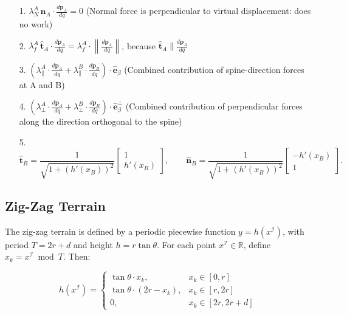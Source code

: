 \documentclass[11pt]{article}
\begin{document}
\begin{itemize}
  \item[1.] \( \lambda_N^A \, \hat{\mathbf{n}}_A \cdot \frac{d\mathbf{p}_A}{dq} = 0 \)  
        (Normal force is perpendicular to virtual displacement: does no work)

  \item[2.] \( \lambda_f^A \, \hat{\mathbf{t}}_A \cdot \frac{d\mathbf{p}_A}{dq}
  = \lambda_f^A \cdot \left\| \frac{d\mathbf{p}_A}{dq} \right\| \),  
  because \( \hat{\mathbf{t}}_A \parallel \frac{d\mathbf{p}_A}{dq} \)

  \item[3.] \( \left( \lambda_{\parallel}^A \cdot \frac{d\mathbf{p}_A}{dq}
    + \lambda_{\parallel}^B \cdot \frac{d\mathbf{p}_B}{dq} \right)
    \cdot \hat{\mathbf{e}}_\beta \)  
    (Combined contribution of spine-direction forces at A and B)

  \item[4.] \( \left( \lambda_{\perp}^A \cdot \frac{d\mathbf{p}_A}{dq}
    + \lambda_{\perp}^B \cdot \frac{d\mathbf{p}_B}{dq} \right)
    \cdot \hat{\mathbf{e}}_\beta^\perp \)  
    (Combined contribution of perpendicular forces along the direction orthogonal to the spine)

    \item[5.]  %
    \[
    \boxed{
    \hat{\mathbf{t}}_B =
    \frac{1}{\sqrt{1 + \left( h'(x_B) \right)^2}}
    \begin{bmatrix}
    1 \\
    h'(x_B)
    \end{bmatrix}
    }, \qquad
    \boxed{
    \hat{\mathbf{n}}_B =
    \frac{1}{\sqrt{1 + \left( h'(x_B) \right)^2}}
    \begin{bmatrix}
    - h'(x_B) \\
    1
    \end{bmatrix}
    }.
    \]
\end{itemize}

\newpage
\subsection{Zig-Zag Terrain}
The zig-zag terrain is defined by a periodic piecewise function \( y = h(x^\mathcal{I}) \), with period \( T = 2r + d \) and height \( h = r \tan\theta \). For each point \( x^\mathcal{I} \in \mathbb{R} \), define \( x_k = x^\mathcal{I} \bmod T \). Then:

\[
h(x^\mathcal{I}) =
\begin{cases}
\tan\theta \cdot x_k, & x_k \in [0, r] \\
\tan\theta \cdot (2r - x_k), & x_k \in [r, 2r] \\
0, & x_k \in [2r, 2r + d]
\end{cases}
\]
\end{document}
